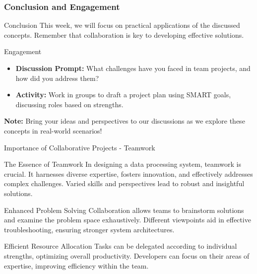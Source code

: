 \documentclass[aspectratio=169]{beamer}
\begin{document}
\begin{frame}[fragile]
    \frametitle{Conclusion and Engagement}
    \begin{block}{Conclusion}
        This week, we will focus on practical applications of the discussed concepts. Remember that collaboration is key to developing effective solutions.
    \end{block}

    \begin{block}{Engagement}
        \begin{itemize}
            \item \textbf{Discussion Prompt:} What challenges have you faced in team projects, and how did you address them?
            \item \textbf{Activity:} Work in groups to draft a project plan using SMART goals, discussing roles based on strengths.
        \end{itemize}
    \end{block}
    
    \textbf{Note:} Bring your ideas and perspectives to our discussions as we explore these concepts in real-world scenarios!
\end{frame}

\begin{frame}[fragile]{Importance of Collaborative Projects - Teamwork}
    \begin{block}{The Essence of Teamwork}
        In designing a data processing system, teamwork is crucial. It harnesses diverse expertise, fosters innovation, and effectively addresses complex challenges. Varied skills and perspectives lead to robust and insightful solutions.
    \end{block}
    
    \begin{block}{Enhanced Problem Solving}
        Collaboration allows teams to brainstorm solutions and examine the problem space exhaustively. Different viewpoints aid in effective troubleshooting, ensuring stronger system architectures.
    \end{block}
    
    \begin{block}{Efficient Resource Allocation}
        Tasks can be delegated according to individual strengths, optimizing overall productivity. Developers can focus on their areas of expertise, improving efficiency within the team.
    \end{block}
\end{frame}
\end{document}
